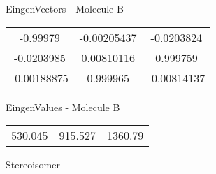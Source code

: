 \begin{multicols}{2}
\begin{center}
\vtab
 EingenVectors - Molecule B     \\
\vtab
\begin{tabular}{|c c c|}
-0.99979	 & 	-0.00205437	 & 	-0.0203824	 \\
-0.0203985	 & 	0.00810116	 & 	0.999759	 \\
-0.00188875	 & 	0.999965	 & 	-0.00814137
\end{tabular}

\vtab
 EingenValues - Molecule B     \\
\vtab
\begin{tabular}{|c c c|}
530.045	 & 	915.527	 & 	1360.79	 \\
\end{tabular}

\end{center}
\end{multicols}
\begin{center}
\vtab
\vtab
\textcolor{NavyBlue}{\Large Stereoisomer}
\end{center}

 \newpage

